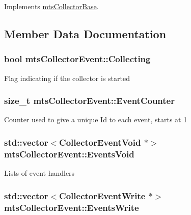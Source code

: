 Implements \hyperlink{classmts_collector_base_a56f67fc120a7088b8d5904a3a785d5dd}{mts\-Collector\-Base}.



\subsection{Member Data Documentation}
\hypertarget{classmts_collector_event_ae9292be0812681c2a314e048a0a4f0a5}{
\subsubsection[{Collecting}]{\setlength{\rightskip}{0pt plus 5cm}bool mts\-Collector\-Event\-::\-Collecting\hspace{0.3cm}{\ttfamily [protected]}}}\label{classmts_collector_event_ae9292be0812681c2a314e048a0a4f0a5}
Flag indicating if the collector is started \hypertarget{classmts_collector_event_a1249f64f2e4e0f3686ee6785bb8b1740}{
\subsubsection[{Event\-Counter}]{\setlength{\rightskip}{0pt plus 5cm}size\-\_\-t mts\-Collector\-Event\-::\-Event\-Counter\hspace{0.3cm}{\ttfamily [protected]}}}\label{classmts_collector_event_a1249f64f2e4e0f3686ee6785bb8b1740}
Counter used to give a unique Id to each event, starts at 1 \hypertarget{classmts_collector_event_a5c71a9d9e4ebcd24d5b72c096aa48615}{
\subsubsection[{Events\-Void}]{\setlength{\rightskip}{0pt plus 5cm}std\-::vector$<${\bf Collector\-Event\-Void} $\ast$$>$ mts\-Collector\-Event\-::\-Events\-Void\hspace{0.3cm}{\ttfamily [protected]}}}\label{classmts_collector_event_a5c71a9d9e4ebcd24d5b72c096aa48615}
Lists of event handlers \hypertarget{classmts_collector_event_a6924ca78e61980e8079b5957e7648ad7}{
\subsubsection[{Events\-Write}]{\setlength{\rightskip}{0pt plus 5cm}std\-::vector$<${\bf Collector\-Event\-Write} $\ast$$>$ mts\-Collector\-Event\-::\-Events\-Write\hspace{0.3cm}{\ttfamily [protected]}}}\label{classmts_collector_event_a6924ca78e61980e8079b5957e7648ad7}
